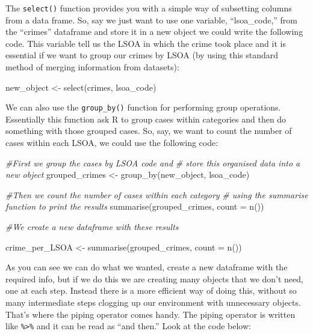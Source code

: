 \documentclass[
  krantz2]{krantz}
\makeatletter
\newenvironment{Shaded}{\begin{snugshade}}{\end{snugshade}}
\newcommand{\AttributeTok}[1]{\textcolor[rgb]{0.61,0.61,0.61}{#1}}
\newcommand{\CommentTok}[1]{\textcolor[rgb]{0.37,0.37,0.37}{\textit{#1}}}
\newcommand{\FunctionTok}[1]{\textcolor[rgb]{0,0,0}{#1}}
\newcommand{\NormalTok}[1]{#1}
\newcommand{\OtherTok}[1]{\textcolor[rgb]{0.37,0.37,0.37}{#1}}
\newenvironment{kframe}{%
\medskip{}
\setlength{\fboxsep}{.8em}
 \def\at@end@of@kframe{}%
 \ifinner\ifhmode%
  \def\at@end@of@kframe{\end{minipage}}%
  \begin{minipage}{\columnwidth}%
 \fi\fi%
 \def\FrameCommand##1{\hskip\@totalleftmargin \hskip-\fboxsep
 \colorbox{shadecolor}{##1}\hskip-\fboxsep
     \hskip-\linewidth \hskip-\@totalleftmargin \hskip\columnwidth}%
 \MakeFramed {\advance\hsize-\width
   \@totalleftmargin\z@ \linewidth\hsize
   \@setminipage}}%
 {\par\unskip\endMakeFramed%
 \at@end@of@kframe}
\renewenvironment{Shaded}{\begin{kframe}}{\end{kframe}}
\makeatother
\begin{document}
The \texttt{select()} function provides you with a simple way of subsetting columns from a data frame. So, say we just want to use one variable, ``lsoa\_code,'' from the ``crimes'' dataframe and store it in a new object we could write the following code. This variable tell us the LSOA in which the crime took place and it is essential if we want to group our crimes by LSOA (by using this standard method of merging information from datasets):

\begin{Shaded}
\begin{Highlighting}[]
\NormalTok{new\_object }\OtherTok{\textless{}{-}} \FunctionTok{select}\NormalTok{(crimes, lsoa\_code)}
\end{Highlighting}
\end{Shaded}

We can also use the \texttt{group\_by()} function for performing group operations. Essentially this function ask R to group cases within categories and then do something with those grouped cases. So, say, we want to count the number of cases within each LSOA, we could use the following code:

\begin{Shaded}
\begin{Highlighting}[]
\CommentTok{\#First we group the cases by LSOA code and }
\CommentTok{\# store this organised data into a new object}
\NormalTok{grouped\_crimes }\OtherTok{\textless{}{-}} \FunctionTok{group\_by}\NormalTok{(new\_object, lsoa\_code)}

\CommentTok{\#Then we count the number of cases within each category }
\CommentTok{\# using the summarise function to print the results}
\FunctionTok{summarise}\NormalTok{(grouped\_crimes, }\AttributeTok{count =} \FunctionTok{n}\NormalTok{())}

\CommentTok{\#We create a new dataframe with these results}

\NormalTok{crime\_per\_LSOA }\OtherTok{\textless{}{-}} \FunctionTok{summarise}\NormalTok{(grouped\_crimes, }\AttributeTok{count =} \FunctionTok{n}\NormalTok{())}
\end{Highlighting}
\end{Shaded}

As you can see we can do what we wanted, create a new dataframe with the required info, but if we do this we are creating many objects that we don't need, one at each step. Instead there is a more efficient way of doing this, without so many intermediate steps clogging up our environment with unnecessary objects. That's where the piping operator comes handy. The piping operator is written like \texttt{\%\textgreater{}\%} and it can be read as ``and then.'' Look at the code below:
\end{document}
